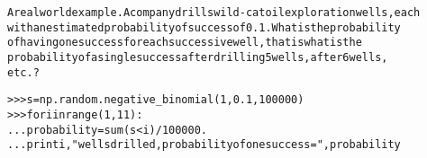 \begin{boxedminipage}{\funcwidth}
\begin{alltt}
A real world example. A company drills wild-cat oil exploration wells, each
with an estimated probability of success of 0.1.  What is the probability
of having one success for each successive well, that is what is the
probability of a single success after drilling 5 wells, after 6 wells,
etc.?

{\textgreater}{\textgreater}{\textgreater} s = np.random.negative\_binomial(1, 0.1, 100000)
{\textgreater}{\textgreater}{\textgreater} for i in range(1, 11):
...    probability = sum(s{\textless}i) / 100000.
...    print i, "wells drilled, probability of one success =", probability
\end{alltt}

\setlength{\parskip}{1ex}
    \end{boxedminipage}

    \label{QSTK:qstklearn:mldiagnostics:noncentral_chisquare}

    \vspace{0.5ex}

